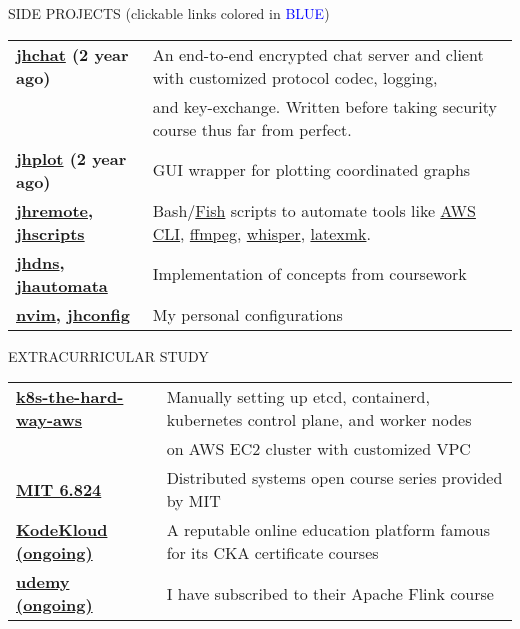 \documentclass{resume} %
\begin{document}
\begin{rSection}{SIDE PROJECTS (clickable links colored in \textcolor{blue}{BLUE})}

\begin{tabular}{ @{} >{\bfseries}l @{\hspace{6ex}} l }
\href{https://github.com/realzhujunhao/jhchat}{jhchat}
(2 year ago) & An end-to-end encrypted chat server and client with
                      customized protocol codec, logging, \\ 
                    & and key-exchange. Written before taking security course thus far from perfect. \\
\href{https://github.com/realzhujunhao/jhplot}{jhplot}
(2 year ago) & GUI wrapper for plotting coordinated graphs \\
\href{https://github.com/realzhujunhao/jhremote}{jhremote},
\href{https://github.com/realzhujunhao/jhscripts}{jhscripts}
& Bash/\href{https://fishshell.com/}{Fish} scripts to automate tools like
\href{https://aws.amazon.com/cli/}{AWS CLI},
\href{https://github.com/FFmpeg/FFmpeg}{ffmpeg}, 
\href{https://github.com/openai/whisper}{whisper}, 
\href{https://mg.readthedocs.io/latexmk.html}{latexmk}. \\
\href{https://github.com/realzhujunhao/jhdns}{jhdns},
\href{https://github.com/realzhujunhao/jhautomata}{jhautomata}
& Implementation of concepts from coursework \\
\href{https://github.com/realzhujunhao/nvim}{nvim},
\href{https://github.com/realzhujunhao/jhconfig}{jhconfig}
& My personal configurations \\
\end{tabular}

\end{rSection} 

\begin{rSection}{EXTRACURRICULAR STUDY}
\begin{tabular}{ @{} >{\bfseries}l @{\hspace{6ex}} l }
\href{https://github.com/realzhujunhao/kubernetes-the-hard-way-aws}{k8s-the-hard-way-aws}
& Manually setting up etcd, containerd, kubernetes control plane, and worker nodes \\ 
& on AWS EC2 cluster with customized VPC \\
\href{https://www.youtube.com/watch?v=cQP8WApzIQQ&list=PLrw6a1wE39_tb2fErI4-WkMbsvGQk9_UB}{MIT 6.824}
& Distributed systems open course series provided by MIT \\
\href{https://kodekloud.com/}{KodeKloud (ongoing)}
& A reputable online education platform famous for its CKA certificate courses \\
\href{https://www.udemy.com/course/apache-flink-a-real-time-hands-on-course-on-flink}{udemy (ongoing)}
& I have subscribed to their Apache Flink course \\
\end{tabular}
\end{rSection}
\end{document}

